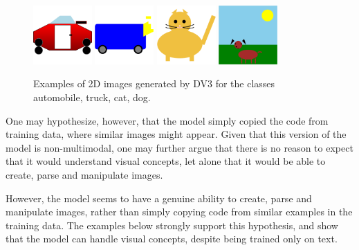 \begin{figure}[ht]
	\centering
	\includegraphics[width=0.2\textwidth]{Section 2/automobile_2d.png}
	\hspace{0.2in}
	\includegraphics[width=0.2\textwidth]{Section 2/truck_2d.png}
	\hspace{0.2in}
	\includegraphics[width=0.2\textwidth]{Section 2/cat_2d.png}
	\hspace{0.2in}
	\includegraphics[width=0.2\textwidth]{Section 2/dog_2d.png}
	\caption{Examples of 2D images generated by DV3 for the classes automobile, truck, cat, dog.}
	\label{fig:2d}
\end{figure}

One may hypothesize, however, that the model simply copied the code from training data, where similar images might appear. Given that this version of the model is non-multimodal, one may further argue that there is no reason to expect that it would understand visual concepts, let alone that it would be able to create, parse and manipulate images. 

However, the model seems to have a genuine ability to create, parse and manipulate images, rather than simply copying code from similar examples in the training data. The examples below strongly support this hypothesis, and show that the model can handle visual concepts, despite being trained only on text.

